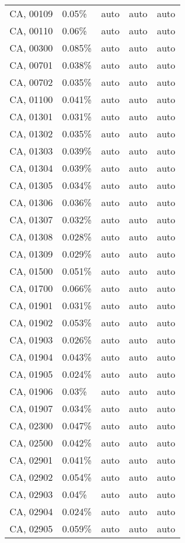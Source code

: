 \begin{longtable}[]{@{}lllll@{}}
CA, 00109 & 0.05\% & auto & auto & auto \\
CA, 00110 & 0.06\% & auto & auto & auto \\
CA, 00300 & 0.085\% & auto & auto & auto \\
CA, 00701 & 0.038\% & auto & auto & auto \\
CA, 00702 & 0.035\% & auto & auto & auto \\
CA, 01100 & 0.041\% & auto & auto & auto \\
CA, 01301 & 0.031\% & auto & auto & auto \\
CA, 01302 & 0.035\% & auto & auto & auto \\
CA, 01303 & 0.039\% & auto & auto & auto \\
CA, 01304 & 0.039\% & auto & auto & auto \\
CA, 01305 & 0.034\% & auto & auto & auto \\
CA, 01306 & 0.036\% & auto & auto & auto \\
CA, 01307 & 0.032\% & auto & auto & auto \\
CA, 01308 & 0.028\% & auto & auto & auto \\
CA, 01309 & 0.029\% & auto & auto & auto \\
CA, 01500 & 0.051\% & auto & auto & auto \\
CA, 01700 & 0.066\% & auto & auto & auto \\
CA, 01901 & 0.031\% & auto & auto & auto \\
CA, 01902 & 0.053\% & auto & auto & auto \\
CA, 01903 & 0.026\% & auto & auto & auto \\
CA, 01904 & 0.043\% & auto & auto & auto \\
CA, 01905 & 0.024\% & auto & auto & auto \\
CA, 01906 & 0.03\% & auto & auto & auto \\
CA, 01907 & 0.034\% & auto & auto & auto \\
CA, 02300 & 0.047\% & auto & auto & auto \\
CA, 02500 & 0.042\% & auto & auto & auto \\
CA, 02901 & 0.041\% & auto & auto & auto \\
CA, 02902 & 0.054\% & auto & auto & auto \\
CA, 02903 & 0.04\% & auto & auto & auto \\
CA, 02904 & 0.024\% & auto & auto & auto \\
CA, 02905 & 0.059\% & auto & auto & auto \\

\end{longtable}
